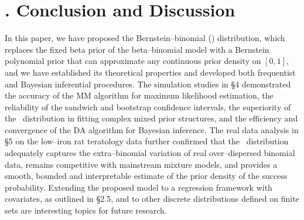 
\section{$\!\!\!\!\!\!\!$. Conclusion and Discussion}    %

In this paper, we have proposed the Bernstein--binomial (\BernBino) distribution, which replaces the fixed beta prior of the beta--binomial model with a Bernstein polynomial prior that can approximate any continuous prior density on $[0,1]$, and we have established its theoretical properties and developed both frequentist and Bayesian inferential procedures. The simulation studies in \S4 demonstrated the accuracy of the MM algorithm for maximum likelihood estimation, the reliability of the sandwich and bootstrap confidence intervals, the superiority of the \BernBino\ distribution in fitting complex mixed prior structures, and the efficiency and convergence of the DA algorithm for Bayesian inference. The real data analysis in \S5 on the low--iron rat teratology data further confirmed that the \BernBino\ distribution adequately captures the extra--binomial variation of real over--dispersed binomial data, remains competitive with mainstream mixture models, and provides a smooth, bounded and interpretable estimate of the prior density of the success probability. Extending the proposed model to a regression framework with covariates, as outlined in \S2.5, and to other discrete distributions defined on finite sets are interesting topics for future research.
